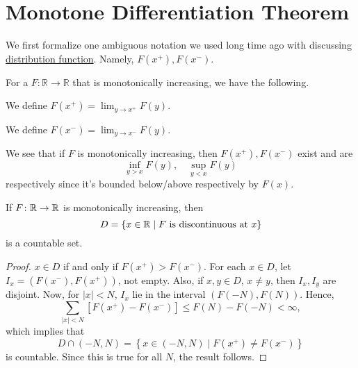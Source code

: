 \section{Monotone Differentiation Theorem}
We first formalize one ambiguous notation we used long time ago with discussing \hyperref[def:distribution-function]{distribution function}.
Namely, \(F(x^+), F(x^-)\).
\begin{definition*}
	For a \(F \colon  \mathbb{R} \to \mathbb{R}\) that is monotonically increasing, we have the following.
	\begin{definition}[\(F(x^+)\)]\label{def:x-plus}
		We define \(F(x^+) = \lim_{y \to x^+} F(y)\).
	\end{definition}
	\begin{definition}[\(F(x^-)\)]\label{def:x-minus}
		We define \(F(x^-) = \lim_{y \to x^-} F(y)\).
	\end{definition}
\end{definition*}
\begin{remark}
	We see that if \(F\) is monotonically increasing, then \(F(x^+), F(x^-)\) exist and are
	\[
		\inf_{y > x} F(y),\quad \sup_{y < x} F(y)
	\]
	respectively since it's bounded below/above respectively by \(F(x)\).
\end{remark}
\begin{lemma}\label{lma:lec-33}
	If \(F\colon \mathbb{\MakeUppercase{r}} \to \mathbb{\MakeUppercase{r}} \) is monotonically increasing, then
	\[
		D = \{x\in \mathbb{\MakeUppercase{r}}  \mid F \text{ is discontinuous at } x\}
	\]
	is a countable set.
\end{lemma}
\begin{proof}
	\(x \in D\) if and only if \(F(x^+) > F(x^-)\). For each \(x \in D\), let \(I_x = (F(x^-),F(x^+))\), not empty.
	Also, if \(x,y \in D\), \(x \neq y\), then \(I_x,I_y\) are disjoint. Now, for \(\left\vert x \right\vert < N\), \(I_x\) lie in the interval
	\((F(-N), F(N))\). Hence,
	\[
		\sum\limits_{\left\vert x \right\vert < N}\left[F(x^+) - F(x^-)\right] \leq F(N) - F(-N) <\infty,
	\]
	which implies that
	\[
		D \cap (-N, N) = \left\{x\in (-N, N) \mid F(x^+) \neq F(x^-)\right\}
	\]
	is countable. Since this is true for all \(N\), the result follows.
\end{proof}

